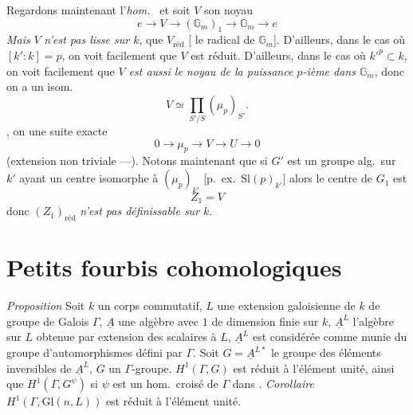 \documentclass[11pt,a4paper]{article}
\begin{document}
Regardons maintenant l'\emph{hom.\ } et soit $V$ son noyau
\[
  e \to V \to (\mathbb{G}_m)_1 \to \mathbb{G}_m \to e
\]
\emph{Mais} $V$ \emph{n'est pas lisse sur $k$}, \struck{\ill{} \ill{}}
 que $V_{\mathrm{réd}}$ [ le radical
 de $\mathbb{G}_m$]. D'ailleurs, dans le cas où $[k':k] = p$,
on voit facilement que $V$ est réduit. D'ailleurs, dans le cas où
$k'^{p} \subset k$, on voit facilement que \emph{$V$ est aussi le noyau de la
puissance $p$-ième dans $\mathbb{G}_m$}, donc on a un isom.
\[
  V \simeq \prod_{S'/S} (\mu_p)_{S'} .
\]
, on \ill{} \ill{} \ill{} \ill{} \ill{} une suite exacte
\[
  0 \to \mu_p \to V \to U \to 0
\]
(extension non triviale ---). Notons maintenant que si $G'$ est un groupe
alg.\ sur $k'$ \add{\ill{} \ill{}} \struck{\ill{}} ayant un centre isomorphe à
$(\mu_p)_{k'}$ [p.\ ex.\ $\mathrm{Sl}(p)_{k'}$] alors le centre de $G_1$ est
\[
  Z_1 = V
\]
donc $(Z_1)_{\mathrm{réd}}$ \emph{n'est pas définissable sur $k$}.

\section*{Petits fourbis cohomologiques}



\emph{Proposition} \quad Soit $k$ un corps commutatif, $L$ une extension
galoisienne de $k$ de groupe de Galois $\Gamma$, $\underline{A}$ une algèbre
avec $1$ de dimension finie sur $k$, $\underline{A}^{L}$ l'algèbre sur $L$
obtenue par extension des scalaires à $L$, $\underline{A}^{L}$ est considérée
comme munie du groupe d'automorphismes défini par $\Gamma$. Soit
$G = \underline{A}^{L*}$ le groupe des éléments inversibles de
$\underline{A}^{L}$, $G$  un $\Gamma$-groupe.
$H^1(\Gamma, G)$ est réduit à l'élément unité, ainsi que $H^1(\Gamma,
G^{\psi})$ si $\psi$ est un hom.\ croisé de $\Gamma$ dans 
. \emph{Corollaire} \quad $H^1(\Gamma,
\mathrm{Gl}(n, L))$ est réduit à l'élément unité.
\end{document}
